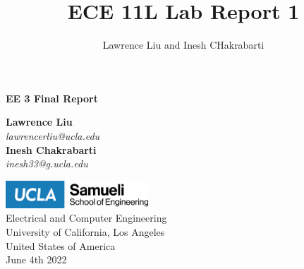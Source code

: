 \documentclass[12pt]{article}
\title{ECE 11L Lab Report 1}
\author{Lawrence Liu and Inesh CHakrabarti}
\begin{document}
\begin{titlepage}
   \begin{center}
        \vspace*{3cm}
        \Huge
        \textbf{EE 3 Final Report}
                
        \vspace{4cm}
        \Large
        \textbf{Lawrence Liu} \\
        \normalsize   
        \textit{lawrencerliu@ucla.edu}\\
        \vspace{1cm}
        \Large
        \textbf{Inesh Chakrabarti} \\
        \normalsize   
        \textit{inesh33@g.ucla.edu}\\

        \vspace{2cm}
            
        \includegraphics[width=0.4\textwidth]{UCLA.png}\\
        \vspace{1cm}
        \large
        Electrical and Computer Engineering\\
        University of California, Los Angeles\\
        United States of America\\
        June 4th 2022
   \end{center}
\end{titlepage}
\end{document}
